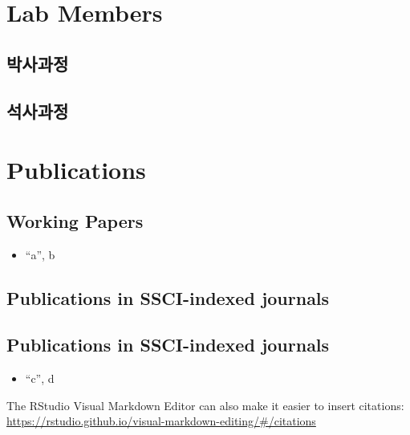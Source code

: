 \documentclass[
]{book}
\providecommand{\tightlist}{%
  \setlength{\itemsep}{0pt}\setlength{\parskip}{0pt}}
\begin{document}
\hypertarget{lab-members}{%
\chapter{Lab Members}\label{lab-members}}

\hypertarget{uxbc15uxc0acuxacfcuxc815}{%
\section{박사과정}\label{uxbc15uxc0acuxacfcuxc815}}

\hypertarget{uxc11duxc0acuxacfcuxc815}{%
\section{석사과정}\label{uxc11duxc0acuxacfcuxc815}}

\hypertarget{publications}{%
\chapter{Publications}\label{publications}}

\hypertarget{working-papers}{%
\section{Working Papers}\label{working-papers}}

\begin{itemize}
\tightlist
\item
  ``a'', b
\end{itemize}

\hypertarget{publications-in-ssci-indexed-journals}{%
\section{Publications in SSCI-indexed journals}\label{publications-in-ssci-indexed-journals}}

\hypertarget{publications-in-ssci-indexed-journals-1}{%
\section{Publications in SSCI-indexed journals}\label{publications-in-ssci-indexed-journals-1}}

\begin{itemize}
\tightlist
\item
  ``c'', d
\end{itemize}

The RStudio Visual Markdown Editor can also make it easier to insert citations: \url{https://rstudio.github.io/visual-markdown-editing/\#/citations}

  
\end{document}

